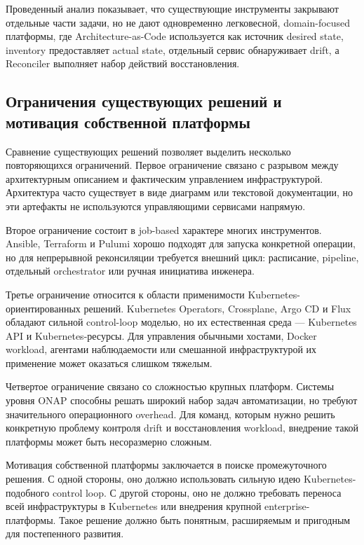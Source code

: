 Проведенный анализ показывает, что существующие инструменты закрывают отдельные части задачи, но не дают одновременно легковесной, domain-focused платформы, где Architecture-as-Code используется как источник desired state, inventory предоставляет actual state, отдельный сервис обнаруживает drift, а Reconciler выполняет набор действий восстановления.

\subsection{Ограничения существующих решений и мотивация собственной платформы}

Сравнение существующих решений позволяет выделить несколько повторяющихся ограничений. Первое ограничение связано с разрывом между архитектурным описанием и фактическим управлением инфраструктурой. Архитектура часто существует в виде диаграмм или текстовой документации, но эти артефакты не используются управляющими сервисами напрямую.

Второе ограничение состоит в job-based характере многих инструментов. Ansible, Terraform и Pulumi хорошо подходят для запуска конкретной операции, но для непрерывной реконсиляции требуется внешний цикл: расписание, pipeline, отдельный orchestrator или ручная инициатива инженера.

Третье ограничение относится к области применимости Kubernetes-ориентированных решений. Kubernetes Operators, Crossplane, Argo CD и Flux обладают сильной control-loop моделью, но их естественная среда --- Kubernetes API и Kubernetes-ресурсы. Для управления обычными хостами, Docker workload, агентами наблюдаемости или смешанной инфраструктурой их применение может оказаться слишком тяжелым.

Четвертое ограничение связано со сложностью крупных платформ. Системы уровня ONAP способны решать широкий набор задач автоматизации, но требуют значительного операционного overhead. Для команд, которым нужно решить конкретную проблему контроля drift и восстановления workload, внедрение такой платформы может быть несоразмерно сложным.

Мотивация собственной платформы заключается в поиске промежуточного решения. С одной стороны, оно должно использовать сильную идею Kubernetes-подобного control loop. С другой стороны, оно не должно требовать переноса всей инфраструктуры в Kubernetes или внедрения крупной enterprise-платформы. Такое решение должно быть понятным, расширяемым и пригодным для постепенного развития.

